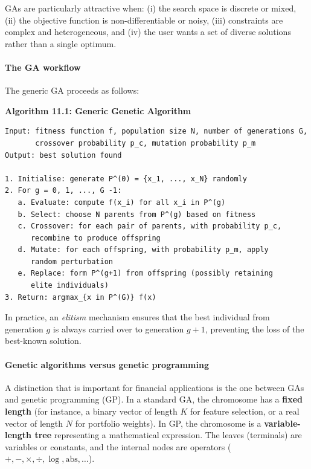 GAs are particularly attractive when: (i) the search space is discrete or mixed, (ii) the objective function is non-differentiable or noisy, (iii) constraints are complex and heterogeneous, and (iv) the user wants a set of diverse solutions rather than a single optimum.

\paragraph{The GA workflow}

The generic GA proceeds as follows:

\textbf{Algorithm 11.1: Generic Genetic Algorithm}

\begin{verbatim}
Input: fitness function f, population size N, number of generations G,
       crossover probability p_c, mutation probability p_m
Output: best solution found

1. Initialise: generate P^(0) = {x_1, ..., x_N} randomly
2. For g = 0, 1, ..., G -1:
   a. Evaluate: compute f(x_i) for all x_i in P^(g)
   b. Select: choose N parents from P^(g) based on fitness
   c. Crossover: for each pair of parents, with probability p_c,
      recombine to produce offspring
   d. Mutate: for each offspring, with probability p_m, apply
      random perturbation
   e. Replace: form P^(g+1) from offspring (possibly retaining
      elite individuals)
3. Return: argmax_{x in P^(G)} f(x)
\end{verbatim}

In practice, an \textit{elitism} mechanism ensures that the best individual from generation $g$ is always carried over to generation $g+1$, preventing the loss of the best-known solution.

\paragraph{Genetic algorithms versus genetic programming}

A distinction that is important for financial applications is the one between GAs and genetic programming (GP). In a standard GA, the chromosome has a \textbf{fixed length} (for instance, a binary vector of length $K$ for feature selection, or a real vector of length $N$ for portfolio weights). In GP, the chromosome is a \textbf{variable-length tree} representing a mathematical expression. The leaves (terminals) are variables or constants, and the internal nodes are operators ($+, -, \times, \div, \log, \text{abs}, \ldots$).

